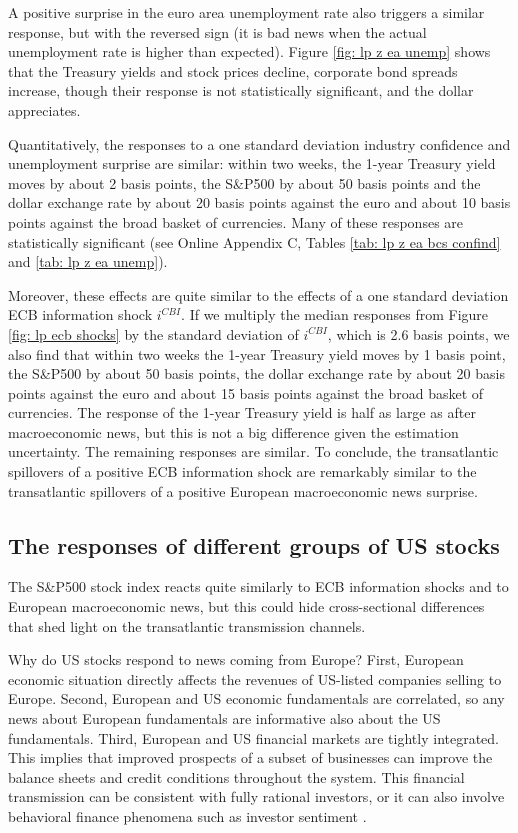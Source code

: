 \documentclass[a4paper,12pt]{article}
\begin{document}
A positive surprise in the euro area unemployment rate also triggers a similar response, but
with the reversed sign (it is bad news when the actual unemployment rate is higher than expected).
Figure \ref{fig: lp z ea unemp} shows that the
Treasury yields and stock prices decline, corporate bond spreads increase, though their
response is not statistically significant, and the dollar appreciates.

Quantitatively, the responses to a one standard deviation industry confidence and unemployment
surprise are similar: within two weeks, the 1-year Treasury yield moves by about 2 basis points,
the S\&P500 by about 50 basis points and the dollar exchange rate by about 20 basis points
against the euro and about 10 basis points against the broad basket of currencies.
Many of these responses are statistically significant (see Online Appendix C, Tables \ref{tab: lp z ea bcs confind} and \ref{tab: lp z ea unemp}).

Moreover, these effects are quite similar to the effects of a one standard deviation ECB information shock $i^{CBI}$.
If we multiply the median responses from Figure \ref{fig: lp ecb shocks} by the standard deviation of $i^{CBI}$, which is 2.6 basis points, we also find that
within two weeks the 1-year Treasury yield moves by 1 basis point,
the S\&P500 by about 50 basis points, the dollar exchange rate by about 20 basis points
against the euro and about 15 basis points against the broad basket of currencies.
The response of the 1-year Treasury yield is half as large as after macroeconomic news,
but this is not a big difference given the estimation uncertainty. The remaining responses are similar.
To conclude, the transatlantic spillovers of a positive ECB information shock are remarkably similar to the transatlantic spillovers of a positive European macroeconomic news surprise.

\subsection{The responses of different groups of US stocks}

The S\&P500 stock index reacts quite similarly to ECB information shocks
and to European macroeconomic news, but this could hide cross-sectional differences
that shed light on the transatlantic transmission channels. 

Why do US stocks respond to news coming from Europe?
First, European economic situation directly affects the revenues of US-listed companies
selling to Europe.
Second, European and US economic fundamentals are correlated,
so any news about European fundamentals are informative also about the US fundamentals. 
Third, European and US financial markets are tightly integrated. This implies that improved
prospects of a subset of businesses can improve the balance sheets and credit conditions throughout
the system. This financial transmission can be consistent with fully rational investors,
or it can also involve behavioral finance phenomena such as investor sentiment \citep{Baker_Wurgler_2006}.
\end{document}
